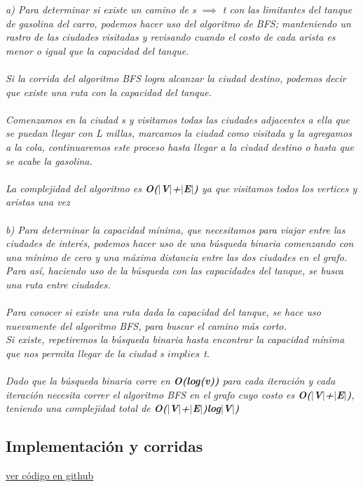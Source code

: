 \documentclass{article}
\begin{document}
\textit{a) Para determinar si existe un camino de s $\implies$ t con las limitantes del tanque de gasolina del carro, podemos hacer uso del algoritmo de BFS; manteniendo un rastro de las ciudades visitadas y revisando cuando el costo de cada arista es menor o igual que la capacidad del tanque.\\\\ Si la corrida del algoritmo BFS logra alcanzar la ciudad destino, podemos decir que existe una ruta con la capacidad del tanque.\\\\ Comenzamos en la ciudad s y visitamos todas las ciudades adjacentes a ella que se puedan llegar con L millas, marcamos la ciudad como visitada y la agregamos a la cola, continuaremos este proceso hasta llegar a la ciudad destino o hasta que se acabe la gasolina. \\\\ La complejidad del algoritmo es \textbf{O($|$V$|$+$|$E$|$)} ya que visitamos todos los vertices y aristas una vez}\\\\

\textit{b) Para determinar la capacidad mínima, que necesitamos para viajar entre las ciudades de interés, podemos hacer uso de una búsqueda binaria comenzando con una mínimo de cero y una máxima distancia entre las dos ciudades en el grafo. Para así, haciendo uso de la búsqueda con las capacidades del tanque, se busca una ruta entre ciudades.\\\\ Para conocer si existe una ruta dada la capacidad del tanque, se hace uso nuevamente del algoritmo BFS, para buscar el camino más corto. \\Si existe, repetiremos la búsqueda binaria hasta encontrar la capacidad mínima que nos permita llegar de la ciudad s $implies$ t. \\\\ Dado que la búsqueda binaria corre en \textbf{O(log(v))} para cada iteración y cada iteración necesita correr el algoritmo BFS en el grafo cuyo costo es \textbf{O($|$V$|$+$|$E$|$)}, teniendo una complejidad total de \textbf{O($|$V$|$+$|$E$|$)log$|$V$|$)} }


\subsection{Implementación y corridas}

\href{https://github.com/luisballado/ADA/tree/main/practice_code/tarea5/car_highways}{ver código en github}\\
\end{document}
